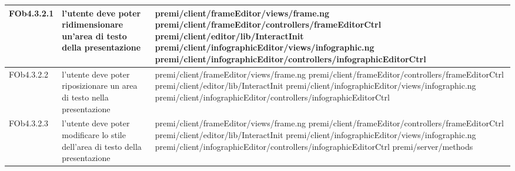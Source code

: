 \begin{longtable}{|l|p{5cm}|p{7cm}|}
\hline
FOb4.3.2.1 & l'utente deve poter ridimensionare un'area di testo della presentazione & \hspace{0pt}premi/client/frameEditor/views/frame.ng \linebreak \linebreak premi/client/frameEditor/controllers/frameEditorCtrl \linebreak \linebreak premi/client/editor/lib/InteractInit \linebreak \linebreak premi/client/infographicEditor/views/infographic.ng \linebreak \linebreak premi/client/infographicEditor/controllers/infographicEditorCtrl \\
\hline
FOb4.3.2.2 & l'utente deve poter riposizionare un area di testo nella presentazione & \hspace{0pt}premi/client/frameEditor/views/frame.ng \linebreak \linebreak premi/client/frameEditor/controllers/frameEditorCtrl \linebreak \linebreak premi/client/editor/lib/InteractInit \linebreak \linebreak premi/client/infographicEditor/views/infographic.ng \linebreak \linebreak premi/client/infographicEditor/controllers/infographicEditorCtrl \\
\hline
FOb4.3.2.3 & l'utente deve poter modificare lo stile dell'area di testo della presentazione &\hspace{0pt}premi/client/frameEditor/views/frame.ng \linebreak \linebreak premi/client/frameEditor/controllers/frameEditorCtrl \linebreak \linebreak premi/client/editor/lib/InteractInit \linebreak \linebreak premi/client/infographicEditor/views/infographic.ng \linebreak \linebreak premi/client/infographicEditor/controllers/infographicEditorCtrl  \linebreak \linebreak premi/server/methods \\

\end{longtable}

